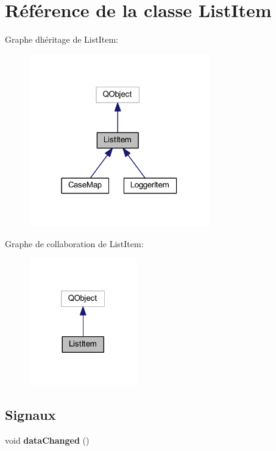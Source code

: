 \hypertarget{class_list_item}{}\section{Référence de la classe List\+Item}
\label{class_list_item}


Graphe d\textquotesingle{}héritage de List\+Item\+:
\nopagebreak
\begin{figure}[H]
\begin{center}
\leavevmode
\includegraphics[width=222pt]{class_list_item__inherit__graph}
\end{center}
\end{figure}


Graphe de collaboration de List\+Item\+:
\nopagebreak
\begin{figure}[H]
\begin{center}
\leavevmode
\includegraphics[width=133pt]{class_list_item__coll__graph}
\end{center}
\end{figure}
\subsection*{Signaux}
\begin{DoxyCompactItemize}
\item 
void {\bfseries data\+Changed} ()\hypertarget{class_list_item_a9662031ae22971e1a4d54d85e5911a41}{}\label{class_list_item_a9662031ae22971e1a4d54d85e5911a41}

\end{DoxyCompactItemize}
